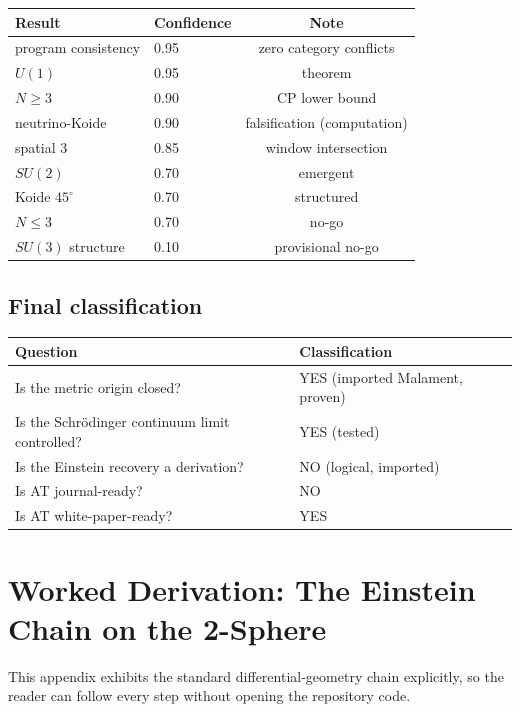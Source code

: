 \documentclass[10pt,twoside,openany]{book}
\begin{document}
\begin{center}
\begin{tabular}{llc}
\toprule
Result & Confidence & Note \\
\midrule
program consistency & 0.95 & zero category conflicts \\
$U(1)$ & 0.95 & theorem \\
$N\ge3$ & 0.90 & CP lower bound \\
neutrino-Koide & 0.90 & falsification (computation) \\
spatial 3 & 0.85 & window intersection \\
$SU(2)$ & 0.70 & emergent \\
Koide $45^\circ$ & 0.70 & structured \\
$N\le3$ & 0.70 & no-go \\
$SU(3)$ structure & 0.10 & provisional no-go \\
\bottomrule
\end{tabular}
\end{center}

\section{Final classification}

\begin{center}
\begin{tabular}{ll}
\toprule
Question & Classification \\
\midrule
Is the metric origin closed? & YES (imported Malament, proven) \\
Is the Schr\"odinger continuum limit controlled? & YES (tested) \\
Is the Einstein recovery a derivation? & NO (logical, imported) \\
Is AT journal-ready? & NO \\
Is AT white-paper-ready? & YES \\
\bottomrule
\end{tabular}
\end{center}


\chapter{Worked Derivation: The Einstein Chain on the 2-Sphere}
\label{app:worked}

This appendix exhibits the standard differential-geometry chain explicitly, so the reader
can follow every step without opening the repository code.
\end{document}
